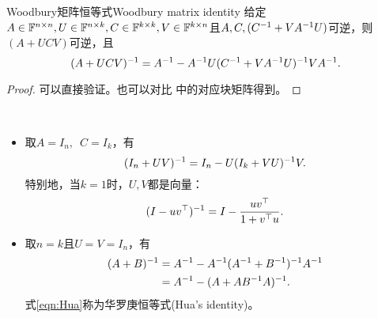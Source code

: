 
\begin{theorem}
	{Woodbury矩阵恒等式}{Woodbury matrix identity}
	给定$A\in\mathbb F^{n\times n},U\in\mathbb F^{n\times k},C\in\mathbb F^{k\times k},V\in\mathbb F^{k\times n}$且$A,C,(C^{-1}+VA^{-1} U)$可逆，则$(A+UCV)$可逆，且 
	\begin{equation}
		(A+UCV)^{-1}=A^{-1}-A^{-1} U(C^{-1}+VA^{-1} U)^{-1} VA^{-1}.
	\end{equation}
\end{theorem}
\begin{proof}
	可以直接验证。也可以对比 中的对应块矩阵得到。
\end{proof}

\begin{corollary}
	~
	\begin{itemize}
		\item 取$A=I_n,\enspace C=I_k$，有
		\begin{equation}
			(I_n+UV)^{-1}=I_n-U(I_k+VU)^{-1} V.
		\end{equation}
		特别地，当$k=1$时，$U,V$都是向量：
		\begin{equation}
			\label{eqn:(I-uvT)-1}
			(I-uv^\top)^{-1}=I-\frac{uv^\top}{1+v^\top u}.
		\end{equation}
		\item 取$n=k$且$U=V=I_n$，有 
		\begin{subequations}
			\begin{align}
				(A+B)^{-1}&=A^{-1}-A^{-1}(A^{-1}+B^{-1})^{-1} A^{-1}\\
				\label{eqn:Hua}
				&=A^{-1}-(A+AB^{-1} A)^{-1}.
			\end{align}
		\end{subequations}
		式\eqref{eqn:Hua}称为华罗庚恒等式(Hua's identity)。
	\end{itemize}
\end{corollary}

